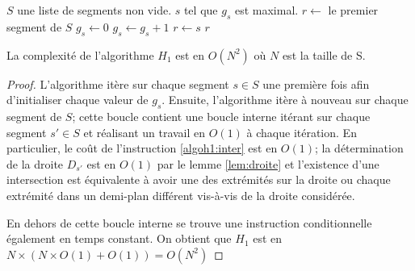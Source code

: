 \begin{algorithm}
  \caption{$H_1$($S$)}
  \begin{algorithmic}[1] \label{algo:h1}
    \REQUIRE $S$ une liste de segments non vide.
    \ENSURE $s$ tel que $g_s$ est maximal.
    \STATE$r\leftarrow$ le premier segment de $S$
    \STATE $g_s\leftarrow 0$
    \ENDFOR
    \label{algoh1:inter}
    \STATE $g_s\leftarrow g_s +1$
    \ENDIF
    \ENDFOR
    \STATE $r\leftarrow s$
    \ENDIF
    \ENDFOR
    \RETURN $r$
  \end{algorithmic}
\end{algorithm}

\begin{prop}
  La complexité de l'algorithme $H_1$ est en $O(N^2)$ où $N$ est la taille de S.
\end{prop}
\begin{proof}
  L'algorithme itère sur chaque segment $s \in S$ une première fois afin
  d'initialiser chaque valeur de $g_s$. Ensuite, l'algorithme itère à nouveau
  sur chaque segment de $S$; cette boucle contient une boucle interne
  itérant sur chaque segment $s' \in S$ et réalisant un travail en $O(1)$
  à chaque itération. En particulier, le coût de l'instruction
  \ref{algoh1:inter} est en $O(1)$; la détermination de la
  droite $D_{s'}$ est en $O(1)$ par le lemme \ref{lem:droite} et
  l'existence d'une intersection est équivalente à avoir une des
  extrémités sur la droite ou chaque extrémité dans un demi-plan
  différent vis-à-vis de la droite considérée.


  En dehors de cette boucle interne se trouve une instruction
  conditionnelle également en temps constant.
  On obtient que $H_1$ est en $N\times(N\times{}O(1) + O(1)) = O(N^2)$
\end{proof}



